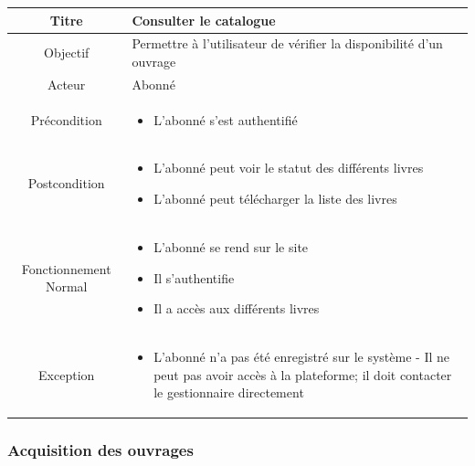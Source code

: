 \begin{tabular}{|c|p{7cm}|}
        \hline
        Titre & Consulter le catalogue  \\
        \hline
        Objectif & Permettre à l'utilisateur de vérifier la disponibilité d'un ouvrage \\
        \hline
        Acteur & Abonné \\
        \hline
        Précondition & \begin{itemize}
                \item L'abonné s'est authentifié 
        \end{itemize} \\
        \hline
        Postcondition & \begin{itemize}
                \item L'abonné peut voir le statut des différents livres
                \item L'abonné peut télécharger la liste des livres
        \end{itemize} \\
        \hline
        Fonctionnement Normal & \begin{itemize}
                \item L'abonné se rend sur le site
                \item Il s'authentifie
                \item Il a accès aux différents livres
        \end{itemize} \\
        \hline
        Exception & \begin{itemize}
                \item L'abonné n'a pas été enregistré sur le système - Il ne peut pas avoir accès à la plateforme; il 
                doit contacter le gestionnaire directement
        \end{itemize} \\
        \hline
\end{tabular}

\subsubsection{Acquisition des ouvrages}
